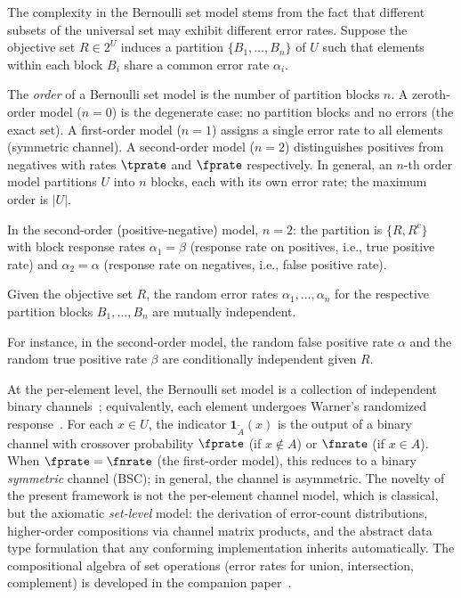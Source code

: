 The complexity in the Bernoulli set model stems from the fact that different subsets of the universal set may exhibit different error rates.
Suppose the objective set $R \in 2^U$ induces a partition $\{B_1, \ldots, B_n\}$ of $U$ such that elements within each block $B_i$ share a common error rate $\alpha_i$.
\begin{definition}
\label{def:model_order}
The \emph{order} of a Bernoulli set model is the number of partition blocks $n$.
A zeroth-order model ($n = 0$) is the degenerate case: no partition blocks and no errors (the exact set).
A first-order model ($n = 1$) assigns a single error rate to all elements (symmetric channel).
A second-order model ($n = 2$) distinguishes positives from negatives with rates $\tprate$ and $\fprate$ respectively.
In general, an $n$-th order model partitions $U$ into $n$ blocks, each with its own error rate; the maximum order is $|U|$.
\end{definition}
In the second-order (positive-negative) model, $n = 2$: the partition is $\{R, R^c\}$ with block response rates $\alpha_1 = \beta$ (response rate on positives, i.e., true positive rate) and $\alpha_2 = \alpha$ (response rate on negatives, i.e., false positive rate).
\begin{axiom}
\label{asm:fpr_fnr_r_indep}
Given the objective set $R$, the random error rates $\alpha_1, \ldots, \alpha_n$ for the respective partition blocks $B_1, \ldots, B_n$ are mutually independent.
\end{axiom}
For instance, in the second-order model, the random false positive rate $\alpha$ and the random true positive rate $\beta$ are conditionally independent given $R$.

\begin{remark}
\label{rem:bsc}
At the per-element level, the Bernoulli set model is a collection of independent binary channels~\cite{shannonBSC}; equivalently, each element undergoes Warner's randomized response~\cite{warner1965}. For each $x \in U$, the indicator $\mathbf{1}_{\tilde{A}}(x)$ is the output of a binary channel with crossover probability $\fprate$ (if $x \notin A$) or $\fnrate$ (if $x \in A$).
When $\fprate = \fnrate$ (the first-order model), this reduces to a binary \emph{symmetric} channel (BSC); in general, the channel is asymmetric.
The novelty of the present framework is not the per-element channel model, which is classical, but the axiomatic \emph{set-level} model: the derivation of error-count distributions, higher-order compositions via channel matrix products, and the abstract data type formulation that any conforming implementation inherits automatically.
The compositional algebra of set operations (error rates for union, intersection, complement) is developed in the companion paper~\cite{bernoulliComposition}.
\end{remark}

